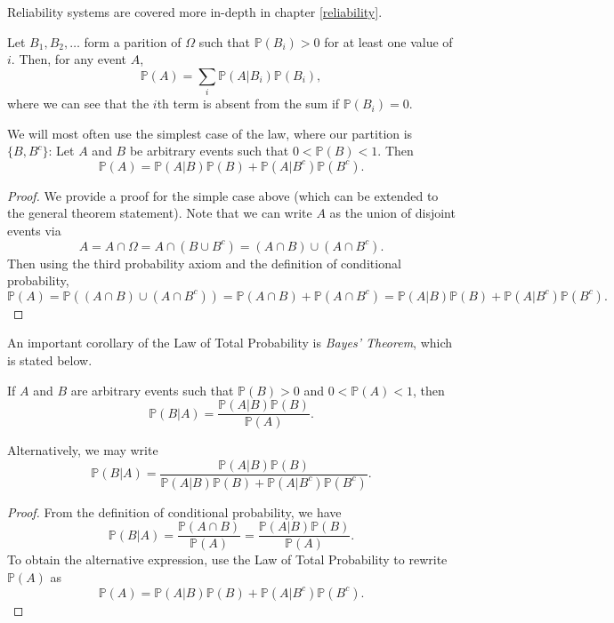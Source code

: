 Reliability systems are covered more in-depth in chapter \ref{reliability}.

\begin{theorem}
    Let $B_1, B_2, \dots$ form a parition of $\Omega$ such that $\mathbb{P}(B_i) > 0$ for at least one value of $i$. Then, for any event $A$,
    \[
        \mathbb{P}(A) = \sum_i \mathbb{P}(A|B_i)\mathbb{P}(B_i)
    ,\]
    where we can see that the $i$th term is absent from the sum if $\mathbb{P}(B_i) = 0$.
\end{theorem}

We will most often use the simplest case of the law, where our partition is $\{B, B^c\}$: Let $A$ and $B$ be arbitrary events such that $0 < \mathbb{P}(B) < 1$. Then
\[
    \mathbb{P}(A) = \mathbb{P}(A|B)\mathbb{P}(B) + \mathbb{P}(A|B^c)\mathbb{P}(B^c)
.\]
\begin{proof}
    We provide a proof for the simple case above (which can be extended to the general theorem statement). Note that we can write $A$ as the union of disjoint events via
    \[
        A = A \cap \Omega = A \cap (B \cup B^c) = (A \cap B) \cup (A \cap B^c)
    .\]
    Then using the third probability axiom and the definition of conditional probability,
    \[
        \mathbb{P}(A) = \mathbb{P}((A \cap B) \cup (A \cap B^c)) = \mathbb{P}(A \cap B) + \mathbb{P}(A \cap B^c) = \mathbb{P}(A|B)\mathbb{P}(B) + \mathbb{P}(A|B^c)\mathbb{P}(B^c)
    .\]
\end{proof}

An important corollary of the Law of Total Probability is \emph{Bayes' Theorem}, which is stated below.

\begin{theorem}
    If $A$ and $B$ are arbitrary events such that $\mathbb{P}(B) > 0$ and $0 < \mathbb{P}(A) < 1$, then
    \[
        \mathbb{P}(B|A) = \frac{\mathbb{P}(A|B)\mathbb{P}(B)}{\mathbb{P}(A)}
    .\]

    Alternatively, we may write
    \[
        \mathbb{P}(B|A) = \frac{\mathbb{P}(A|B)\mathbb{P}(B)}{\mathbb{P}(A|B)\mathbb{P}(B) + \mathbb{P}(A|B^c)\mathbb{P}(B^c)}
    .\]
    
\end{theorem}

\begin{proof}
    From the definition of conditional probability, we have
    \[
        \mathbb{P}(B|A) = \frac{\mathbb{P}(A \cap B)}{\mathbb{P}(A)} = \frac{\mathbb{P}(A|B)\mathbb{P}(B)}{\mathbb{P}(A)}
    .\]
    To obtain the alternative expression, use the Law of Total Probability to rewrite $\mathbb{P}(A)$ as
    \[
        \mathbb{P}(A) = \mathbb{P}(A|B)\mathbb{P}(B) + \mathbb{P}(A|B^c)\mathbb{P}(B^c)
    .\]
\end{proof}


